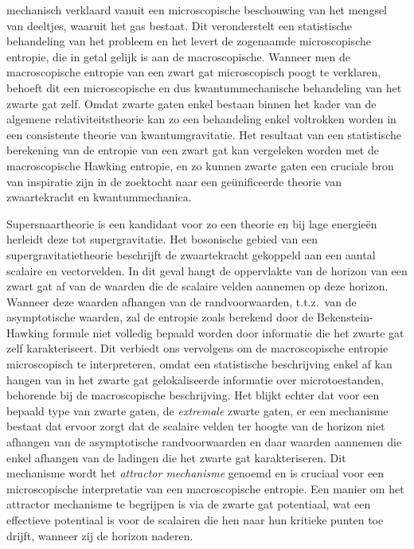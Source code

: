 \documentclass[12pt,twoside]{book}
\begin{document}
\begin{appendices}
mechanisch verklaard vanuit een microscopische beschouwing van het mengsel van deeltjes, waaruit het gas bestaat. Dit veronderstelt een statistische behandeling van het probleem en het levert de zogenaamde microscopische entropie, die in getal gelijk is aan de macroscopische. Wanneer men de macroscopische entropie van een zwart gat microscopisch poogt te verklaren, behoeft dit een microscopische en dus kwantummechanische behandeling van het zwarte gat zelf. Omdat zwarte gaten enkel bestaan binnen het kader van de algemene relativiteitstheorie kan zo een behandeling enkel voltrokken worden in een consistente theorie van kwantumgravitatie.
Het resultaat van een statistische berekening van de entropie van een zwart gat kan vergeleken worden met de macroscopische Hawking entropie, en zo kunnen zwarte gaten een cruciale bron van inspiratie zijn in de zoektocht naar een ge\"unificeerde theorie van zwaartekracht en kwantummechanica.

Supersnaartheorie is een kandidaat voor zo een theorie en bij lage energie\"en herleidt deze tot supergravitatie. Het bosonische gebied van een supergravitatietheorie beschrijft de zwaartekracht gekoppeld aan een aantal scalaire en vectorvelden. In dit geval hangt de oppervlakte van de horizon van een zwart gat af van de waarden die de scalaire velden aannemen op deze horizon. Wanneer deze waarden afhangen van de randvoorwaarden, t.t.z.\ van de asymptotische waarden, zal de entropie zoals berekend door de Bekenstein-Hawking formule niet volledig bepaald worden door informatie die het zwarte gat zelf karakteriseert. Dit verbiedt ons vervolgens om de macroscopische entropie microscopisch te interpreteren, omdat een statistische beschrijving enkel af kan hangen van in het zwarte gat gelokaliseerde informatie over microtoestanden, behorende bij de macroscopische beschrijving. Het blijkt echter dat voor een bepaald type van zwarte gaten, de \emph{extremale} zwarte gaten, er een mechanisme bestaat dat ervoor zorgt dat de scalaire velden ter hoogte van de horizon niet afhangen van de asymptotische randvoorwaarden en daar waarden aannemen die enkel afhangen van de ladingen die het zwarte gat karakteriseren. Dit mechanisme wordt het \emph{attractor mechanisme} genoemd en is cruciaal voor een microscopische interpretatie van een macroscopische entropie. Een manier om het attractor mechanisme te begrijpen is via de zwarte gat potentiaal, wat een effectieve potentiaal is voor de scalairen die hen naar hun kritieke punten toe drijft, wanneer zij de horizon naderen.


\end{appendices}
\end{document}
